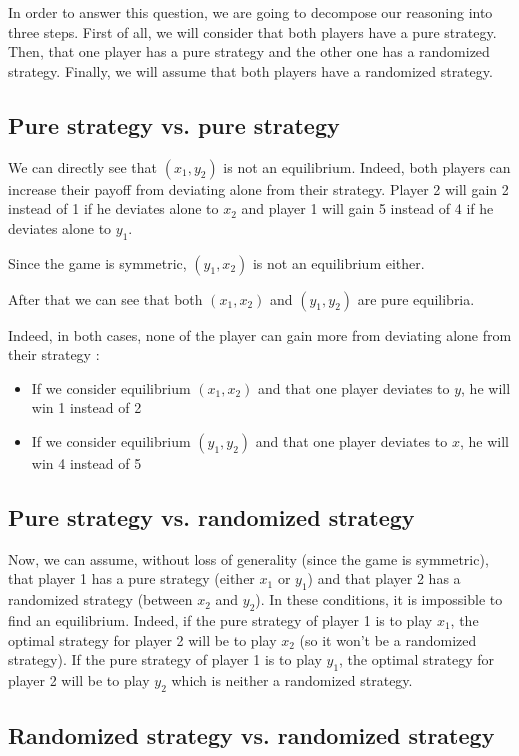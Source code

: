In order to answer this question, we are going to decompose our reasoning into three steps.
First of all, we will consider that both players have a pure strategy. Then, that one player has a pure strategy and the other one has a randomized strategy. Finally, we will assume that both players have a randomized strategy.

\subsection*{Pure strategy vs. pure strategy}

We can directly see that $(x_1, y_2)$ is not an equilibrium. Indeed, both players can increase their payoff from deviating alone from their strategy. Player 2 will gain 2 instead of 1 if he deviates alone to $x_2$ and player 1 will gain 5 instead of 4 if he deviates alone to $y_1$.

Since the game is symmetric, $(y_1, x_2)$ is not an equilibrium either.

After that we can see that both $(x_1, x_2)$ and $(y_1, y_2)$ are pure equilibria.

Indeed, in both cases, none of the player can gain more from deviating alone from their strategy :
\begin{itemize}
	\item If we consider equilibrium $(x_1, x_2)$ and that one player deviates to $y$, he will win 1 instead of 2
	\item If we consider equilibrium $(y_1, y_2)$ and that one player deviates to $x$, he will win 4 instead of 5
\end{itemize}

\subsection*{Pure strategy vs. randomized strategy}

Now, we can assume, without loss of generality (since the game is symmetric), that player 1 has a pure strategy (either $x_1$ or $y_1$) and that player 2 has a randomized strategy (between $x_2$ and $y_2$). In these conditions, it is impossible to find an equilibrium. Indeed, if the pure strategy of player 1 is to play $x_1$, the optimal strategy for player 2 will be to play $x_2$ (so it won't be a randomized strategy). If the pure strategy of player 1 is to play $y_1$, the optimal strategy for player 2 will be to play $y_2$ which is neither a randomized strategy.

\subsection*{Randomized strategy vs. randomized strategy}

